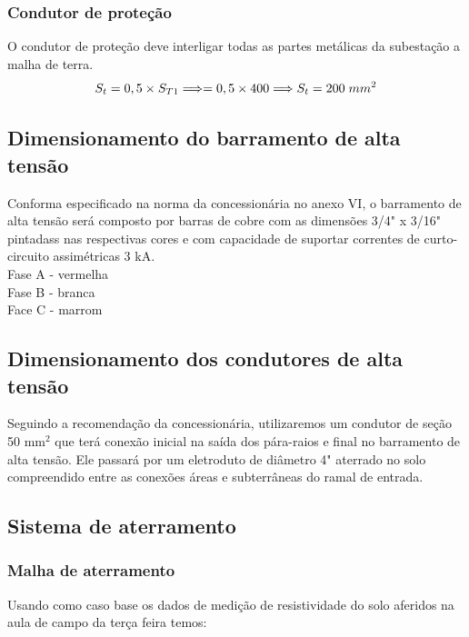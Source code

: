 \subsubsection{Condutor de proteção}
O condutor de proteção deve interligar todas as partes metálicas da subestação a malha de terra.
\begin{equation*}
{S}_{t}=0,5\times {S}_{T1} \Longrightarrow = 0,5\times 400 \Longrightarrow {S}_{t}= 200 \hspace{0.1cm}mm^2
\end{equation*}



\subsection{Dimensionamento do barramento de alta tensão}
Conforma especificado na norma da concessionária no anexo VI, o barramento de alta tensão será
composto por barras de cobre com as dimensões 3/4" x 3/16" pintadass nas respectivas cores e com
capacidade de suportar correntes de curto-circuito assimétricas 3 kA.\\
Fase A - vermelha\\
Fase B - branca\\
Face C - marrom

\subsection{Dimensionamento dos condutores de alta tensão}
Seguindo a recomendação da concessionária, utilizaremos um condutor de seção 50 mm$^2$ que terá
conexão inicial na saída dos pára-raios e final no barramento de alta tensão. Ele passará por um eletroduto
de diâmetro 4" aterrado no solo compreendido entre as conexões áreas e subterrâneas do ramal de
entrada.

\subsection{Sistema de aterramento}

\subsubsection{Malha de aterramento}
Usando como caso base os dados de medição de resistividade do solo aferidos na aula de campo da terça feira temos:

